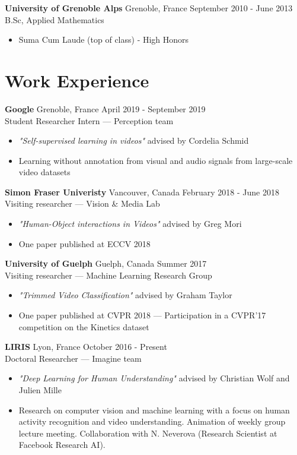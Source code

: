 \documentclass[10pt]{res} %
\begin{document}
\begin{resume}
\textbf{University of Grenoble Alps} \hfill Grenoble, France \hfill September 2010 - June 2013 \\
B.Sc, Applied Mathematics
\begin{itemize}
\item Suma Cum Laude (top of class) - High Honors
\end{itemize}
 

\section{\large Work Experience} 

\textbf{Google} \hfill Grenoble, France \hfill April 2019 - September 2019 \\
Student Researcher Intern --- Perception team
\begin{itemize}
\item \textit{"Self-supervised learning in videos" } advised by Cordelia Schmid
\item Learning without annotation from visual and audio signals from large-scale video datasets
\end{itemize}


\textbf{Simon Fraser Univeristy} \hfill Vancouver, Canada \hfill February 2018 - June 2018 \\
Visiting researcher --- Vision \& Media Lab
\begin{itemize}
\item \textit{"Human-Object interactions in Videos" } advised by Greg Mori
\item One paper published at ECCV 2018
\end{itemize}


\textbf{University of Guelph} \hfill Guelph, Canada \hfill Summer 2017 \\
Visiting researcher --- Machine Learning Research Group
\begin{itemize}
\item \textit{"Trimmed Video Classification"} advised by Graham Taylor
\item One paper published at CVPR 2018 --- Participation in a CVPR'17 competition on the Kinetics dataset
\end{itemize}

\textbf{LIRIS} \hfill Lyon, France \hfill October 2016 - Present \\
Doctoral Researcher --- Imagine team
\begin{itemize}
\item \textit{"Deep Learning for Human Understanding"} advised by Christian Wolf and Julien Mille
\item Research on computer vision and machine learning with a focus on human activity recognition and video understanding. Animation of weekly group lecture meeting. Collaboration with N. Neverova (Research Scientist at Facebook Research AI).
\end{itemize}


\end{resume}
\end{document}
